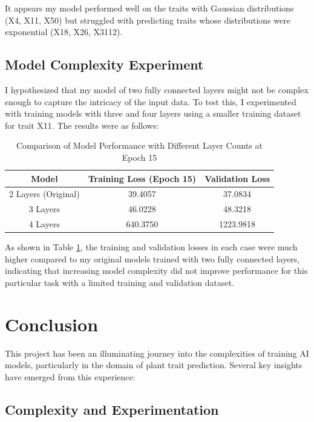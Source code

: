 \documentclass{article}
\begin{document}
It appears my model performed well on the traits with Gaussian distributions (X4, X11, X50) but struggled with predicting traits whose distributions were exponential (X18, X26, X3112).

\subsection{Model Complexity Experiment}

I hypothesized that my model of two fully connected layers might not be complex enough to capture the intricacy of the input data. To test this, I experimented with training models with three and four layers using a smaller training dataset for trait X11. The results were as follows:

\begin{table}[h]
    \centering
    \begin{tabular}{|c|c|c|}
        \hline
        Model & Training Loss (Epoch 15) & Validation Loss \\
        \hline
        2 Layers (Original) & 39.4057 & 37.0834 \\
        3 Layers & 46.0228 & 48.3218 \\
        4 Layers & 640.3750 & 1223.9818 \\
        \hline
    \end{tabular}
    \caption{Comparison of Model Performance with Different Layer Counts at Epoch 15}
    \label{tab:model_comparison}
\end{table}

As shown in Table \ref{tab:model_comparison}, the training and validation losses in each case were much higher compared to my original models trained with two fully connected layers, indicating that increasing model complexity did not improve performance for this particular task with a limited training and validation dataset.

\section{Conclusion}

This project has been an illuminating journey into the complexities of training AI models, particularly in the domain of plant trait prediction. Several key insights have emerged from this experience:

\subsection{Complexity and Experimentation}
\end{document}
